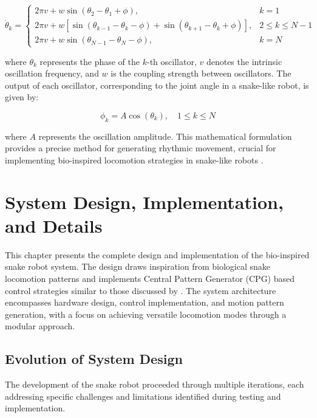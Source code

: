 \documentclass[12pt,a4paper]{report}
\begin{document}
\begin{equation}
    \dot{\theta}_k =
    \begin{cases} 
        2\pi v + w \sin(\theta_2 - \theta_1 + \phi), & k = 1 \\
        2\pi v + w \left[\sin(\theta_{k-1} - \theta_k - \phi) + \sin(\theta_{k+1} - \theta_k + \phi)\right], & 2 \leq k \leq N-1 \\
        2\pi v + w \sin(\theta_{N-1} - \theta_N - \phi), & k = N
    \end{cases}
\end{equation}

where \( \theta_k \) represents the phase of the \( k \)-th oscillator, \( v \) denotes the intrinsic oscillation frequency, and \( w \) is the coupling strength between oscillators. The output of each oscillator, corresponding to the joint angle in a snake-like robot, is given by:

\begin{equation}
    \phi_k = A \cos(\theta_k), \quad 1 \leq k \leq N
\end{equation}

where \( A \) represents the oscillation amplitude. This mathematical formulation provides a precise method for generating rhythmic movement, crucial for implementing bio-inspired locomotion strategies in snake-like robots \textcite{wang2020cpg}.



\chapter{System Design, Implementation, and Details}

This chapter presents the complete design and implementation of the bio-inspired snake robot system. The design draws inspiration from biological snake locomotion patterns \cite{transeth-2009} and implements Central Pattern Generator (CPG) based control strategies similar to those discussed by \cite{Inoue2007}. The system architecture encompasses hardware design, control implementation, and motion pattern generation, with a focus on achieving versatile locomotion modes through a modular approach.

\section{Evolution of System Design}
The development of the snake robot proceeded through multiple iterations, each addressing specific challenges and limitations identified during testing and implementation.
\end{document}
